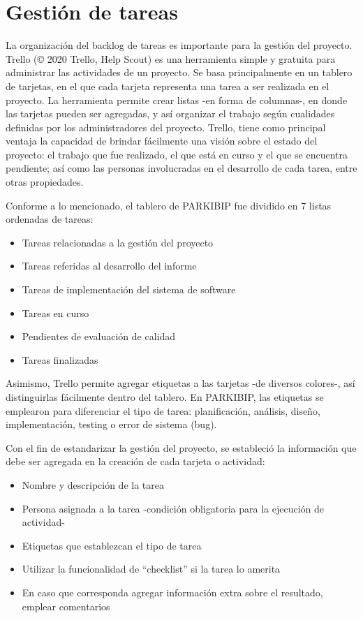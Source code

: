 \section{Gestión de tareas}
La organización del \gls{backlog} de tareas es importante para la gestión del proyecto. Trello (© 2020 Trello, Help Scout) es una herramienta simple y gratuita para administrar las actividades de un proyecto. Se basa principalmente en un tablero de tarjetas, en el que cada tarjeta representa una tarea a ser realizada en el proyecto. La herramienta permite crear listas -en forma de columnas-, en donde las tarjetas pueden ser agregadas, y así organizar el trabajo según cualidades definidas por los administradores del proyecto. Trello, tiene como principal ventaja la capacidad de brindar fácilmente una visión sobre el estado del proyecto: el trabajo que fue realizado, el que está en curso y el que se encuentra pendiente; así como las personas involucradas en el desarrollo de cada tarea, entre otras propiedades. 

Conforme a lo mencionado, el tablero de PARKIBIP fue dividido en 7 listas ordenadas de tareas:

\begin{itemize}
    \item Tareas relacionadas a la gestión del proyecto
    \item Tareas referidas al desarrollo del informe
    \item Tareas de implementación del sistema de software 
    \item Tareas en curso 
    \item Pendientes de evaluación de calidad
    \item Tareas finalizadas
\end{itemize}

Asimismo, Trello permite agregar etiquetas a las tarjetas -de diversos colores-, así distinguirlas fácilmente dentro del tablero. En PARKIBIP, las etiquetas se emplearon para diferenciar el tipo de tarea: planificación, análisis, diseño, implementación, testing o error de sistema (bug). 

Con el fin de estandarizar la gestión del proyecto, se estableció la información que debe ser agregada en la creación de cada tarjeta o actividad:

\begin{itemize}
    \item Nombre y descripción de la tarea 
    \item Persona asignada a la tarea -condición obligatoria para la ejecución de actividad-
    \item Etiquetas que establezcan el tipo de tarea 
    \item Utilizar la funcionalidad de ``checklist'' si la tarea lo amerita 
    \item En caso que corresponda agregar información extra sobre el resultado, emplear comentarios
\end{itemize}

